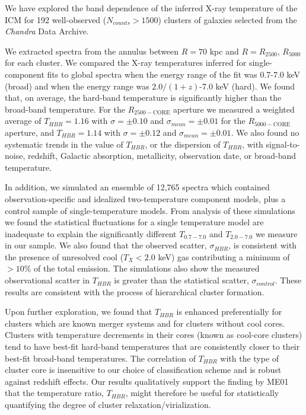 \documentclass[apj]{emulateapj}
\begin{document}
We have explored the band dependence of the inferred X-ray temperature
of the ICM for 192 well-observed ($N_{counts} > 1500$) clusters of
galaxies selected from the {\it Chandra} Data Archive.

We extracted spectra from the annulus between $R=70$ kpc and
$R=R_{2500}$, $R_{5000}$ for each cluster. We compared the X-ray
temperatures inferred for single-component fits to global spectra
when the energy range of the fit was 0.7-7.0 keV (broad) and when the
energy range was $2.0/(1+z)$-7.0 keV (hard). We found that, on
average, the hard-band temperature is significantly higher than
the broad-band temperature. For the $R_{2500-\mathrm{CORE}}$ aperture
we measured a weighted average of $T_{HBR} = 1.16$ with $\sigma = \pm
0.10$ and $\sigma_{mean} = \pm 0.01$ for the $R_{5000-\mathrm{CORE}}$
aperture, and $T_{HBR} = 1.14$ with $\sigma = \pm 0.12$ and
$\sigma_{mean} = \pm 0.01$. We also found no systematic trends in the
value of $T_{HBR}$, or the dispersion of $T_{HBR}$, with
signal-to-noise, redshift, Galactic absorption, metallicity,
observation date, or broad-band temperature.

In addition, we simulated an ensemble of 12,765 spectra which
contained observation-specific and idealized two-temperature component
models, plus a control sample of single-temperature models. From
analysis of these simulations we found the statistical fluctuations
for a single temperature model are inadequate to explain the 
significantly different $T_{0.7-7.0}$ and $T_{2.0-7.0}$ we measure in
our sample. We also found that the observed scatter, $\sigma_{HBR}$,
is consistent with the presence of unresolved cool ($T_X < 2.0$ keV)
gas contributing a minimum of $>10\%$ of the total emission. The
simulations also show the measured observational scatter in $T_{HBR}$
is greater than the statistical scatter, $\sigma_{control}$. These
results are consistent with the process of hierarchical cluster
formation.

Upon further exploration, we found that $T_{HBR}$ is enhanced
preferentially for clusters which are known merger systems and for
clusters without cool cores. Clusters with temperature decrements in
their cores (known as cool-core clusters) tend to have best-fit
hard-band temperatures that are consistently closer to their
best-fit broad-band temperatures. The correlation of $T_{HBR}$ with
the type of cluster core is insensitive to our choice of
classification scheme and is robust against redshift effects. Our
results qualitatively support the finding by ME01 that the temperature
ratio, $T_{HBR}$, might therefore be useful for statistically
quantifying the degree of cluster relaxation/virialization.
\end{document}
